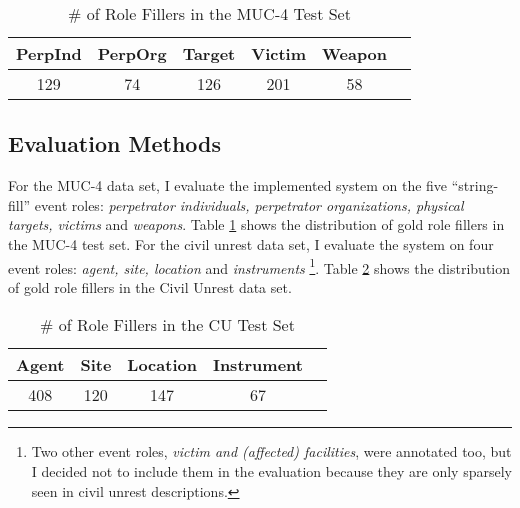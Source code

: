 \begin{table}[ht]
\centering
\footnotesize
\begin{tabular}{|c|c|c|c|c|c|}
\hline
PerpInd & PerpOrg & Target & Victim & Weapon \\ \hline
129 & 74 & 126 & 201 & 58 \\
\hline
\end{tabular}
\caption{\# of Role Fillers in the MUC-4 Test Set}
\label{test-set-stats}
\end{table}




\subsection{Evaluation Methods}
\label{tier:eval-methods}
For the MUC-4 data set, I evaluate the implemented system on the five  ``string-fill'' event roles: {\it perpetrator
 individuals, perpetrator organizations, physical targets, victims}
 and {\it weapons}.  
Table \ref{test-set-stats}
shows the distribution of gold role fillers in the MUC-4 test set. 
For the civil unrest data set, I evaluate the system on four event roles: 
{\it agent, site, location} and {\it instruments} \footnote{
Two other event roles, {\it victim and (affected) facilities}, were annotated too, 
but I decided not to include them in the evaluation because they 
are only sparsely seen in civil unrest descriptions.}. 
Table \ref{test-set-stats-cu} shows the distribution of gold role fillers in the 
Civil Unrest data set.

\begin{table}[ht]
\centering
\footnotesize
\begin{tabular}{|c|c|c|c|c|}
\hline
Agent & Site & Location  & Instrument \\ \hline
408 & 120 & 147  & 67 \\
\hline
\end{tabular}
\caption{\# of Role Fillers in the CU Test Set}
\label{test-set-stats-cu}
\end{table}


